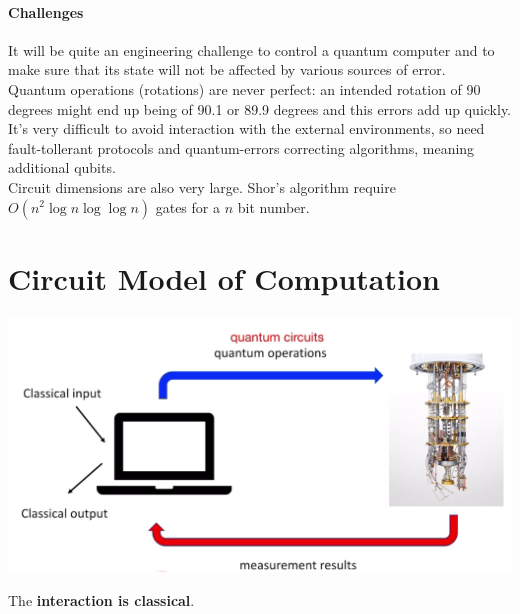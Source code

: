 \documentclass[10pt]{report}
\begin{document}
\paragraph{Challenges} It will be quite an engineering challenge to control a quantum computer and to make sure that its state will not be affected by various sources of error.\\
Quantum operations (rotations) are never perfect: an intended rotation of 90 degrees might end up being of 90.1 or 89.9 degrees and this errors add up quickly.\\
It's very difficult to avoid interaction with the external environments, so need fault-tollerant protocols and quantum-errors correcting algorithms, meaning additional qubits.\\
Circuit dimensions are also very large. Shor's algorithm require $O(n^2\log n\log\log n)$ gates for a $n$ bit number.
\section{Circuit Model of Computation}
\begin{center}
	\includegraphics[scale=0.5]{9.png}
\end{center}
The \textbf{interaction is classical}.
\end{document}
